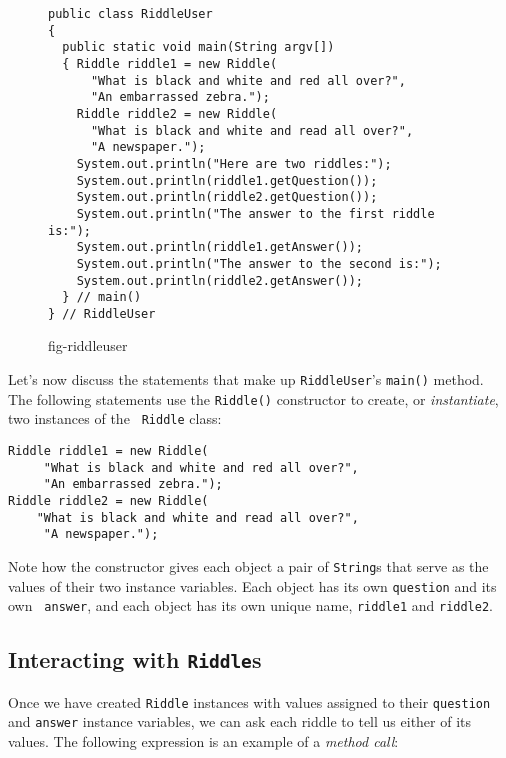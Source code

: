 \begin{figure}[bh]
\jjjprogstart
\begin{jjjlisting}[27pc]
\begin{lstlisting}
public class RiddleUser
{
  public static void main(String argv[])
  { Riddle riddle1 = new Riddle(
      "What is black and white and red all over?",
      "An embarrassed zebra.");
    Riddle riddle2 = new Riddle(
      "What is black and white and read all over?",
      "A newspaper.");
    System.out.println("Here are two riddles:");
    System.out.println(riddle1.getQuestion());
    System.out.println(riddle2.getQuestion());
    System.out.println("The answer to the first riddle is:");
    System.out.println(riddle1.getAnswer());
    System.out.println("The answer to the second is:");
    System.out.println(riddle2.getAnswer());
  } // main()
} // RiddleUser
\end{lstlisting}
\end{jjjlisting}
{fig-riddleuser}
\end{figure}

\noindent Let's now discuss the statements that make up {\tt RiddleUser}'s 
{\tt main()} method.  The following statements use the {\tt Riddle()}
constructor to create, or {\it instantiate}, two instances of the {\tt
Riddle} class:

\begin{jjjlisting}
\begin{lstlisting}
Riddle riddle1 = new Riddle(
     "What is black and white and red all over?",
     "An embarrassed zebra.");
Riddle riddle2 = new Riddle(
    "What is black and white and read all over?",
     "A newspaper.");
\end{lstlisting}
\end{jjjlisting}

\noindent Note how the constructor gives each object a pair
of {\tt String}s that serve as the values of their two instance
variables. Each object has its own {\tt question} and its own {\tt
answer}, and each object has its own unique name, {\tt riddle1} and
{\tt riddle2}.

\subsection{Interacting with {\tt Riddle}s }
\noindent Once we have created {\tt Riddle} instances with values
assigned to their {\tt question} and {\tt answer} instance variables,
we can ask each riddle to tell us either of its values.  The following
expression is an example of a {\it method call}:

